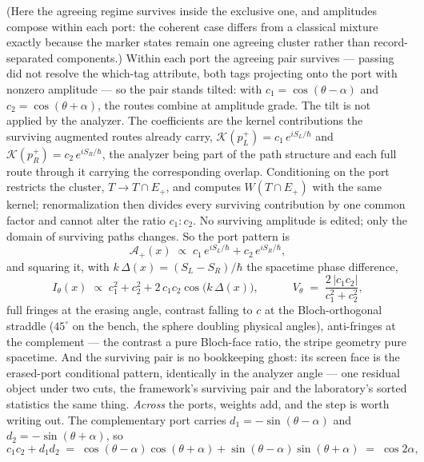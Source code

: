(Here the agreeing regime survives inside the exclusive one, and amplitudes compose within each port: the coherent case differs from a classical mixture exactly because the marker states remain one agreeing cluster rather than record-separated components.) Within each port the agreeing pair survives --- passing did not resolve the which-tag attribute, both tags projecting onto the port with nonzero amplitude --- so the pair stands tilted: with $c_1 = \cos(\theta - \alpha)$ and $c_2 = \cos(\theta + \alpha)$, the routes combine at amplitude grade. The tilt is not applied by the analyzer. The coefficients are the kernel contributions the surviving augmented routes already carry, $\mathcal{K}(p_L^{+}) = c_1\, e^{iS_L/\hbar}$ and $\mathcal{K}(p_R^{+}) = c_2\, e^{iS_R/\hbar}$, the analyzer being part of the path structure and each full route through it carrying the corresponding overlap. Conditioning on the port restricts the cluster, $T \to T \cap E_{+}$, and computes $W(T \cap E_{+})$ with the same kernel; renormalization then divides every surviving contribution by one common factor and cannot alter the ratio $c_1 : c_2$. No surviving amplitude is edited; only the domain of surviving paths changes. So the port pattern is
\begin{equation}\label{eq:portamp}
\mathcal{A}_{+}(x) \;\propto\; c_1\, e^{iS_L/\hbar} + c_2\, e^{iS_R/\hbar},
\end{equation}
and squaring it, with $k\,\Delta(x) = (S_L - S_R)/\hbar$ the spacetime phase difference,
\begin{equation}\label{eq:twotag}
I_\theta(x) \;\propto\; c_1^2 + c_2^2 + 2\, c_1 c_2 \cos\!\big(k\,\Delta(x)\big), \qquad\quad V_\theta \;=\; \frac{2\,|c_1 c_2|}{c_1^2 + c_2^2},
\end{equation}
full fringes at the erasing angle, contrast falling to $c$ at the Bloch-orthogonal straddle ($45^\circ$ on the bench, the sphere doubling physical angles), anti-fringes at the complement --- the contrast a pure Bloch-face ratio, the stripe geometry pure spacetime. And the surviving pair is no bookkeeping ghost: its screen face is the erased-port conditional pattern, identically in the analyzer angle --- one residual object under two cuts, the framework's surviving pair and the laboratory's sorted statistics the same thing. \emph{Across} the ports, weights add, and the step is worth writing out. The complementary port carries $d_1 = -\sin(\theta - \alpha)$ and $d_2 = -\sin(\theta + \alpha)$, so
\begin{equation}\label{eq:nosig}
c_1 c_2 + d_1 d_2 \;=\; \cos(\theta - \alpha)\cos(\theta + \alpha) + \sin(\theta - \alpha)\sin(\theta + \alpha) \;=\; \cos 2\alpha,
\end{equation}
